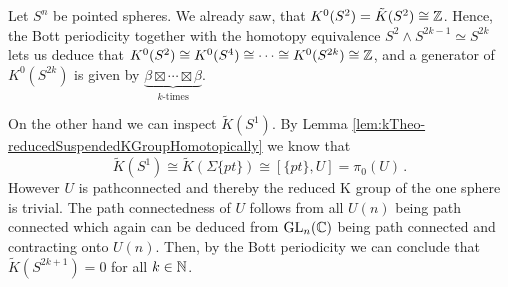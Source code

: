 \begin{corollary}[Spheres] \label{cor:kTheo-kGroupsOfTheSpheres}
	Let $S^n$ be pointed spheres. We already saw, that $K^0(S^2)=\tilde{K}(S^2)\cong \mathbb{Z}$. 
	Hence, the Bott periodicity together with the homotopy equivalence $S^2\wedge S^{2{k-1}}\simeq S^{2k}$ lets us deduce that $K^0(S^2)\cong K^0(S^4)\cong \cdots \cong K^0(S^{2k})\cong \mathbb{Z}$, and a generator of $ K^0(S^{2k})$ is given by $\underbrace{\beta\boxtimes \cdots \boxtimes  \beta}_{k\text{-times}}$. 

	On the other hand we can inspect $\tilde{K}(S^1)$. By Lemma \ref{lem:kTheo-reducedSuspendedKGroupHomotopically} we know that 
	\begin{equation*}
		\tilde{K}(S^1)\cong \tilde{K}(\Sigma\{pt\})\cong[\{pt\},U]=\pi_0(U)\,.
	\end{equation*} However $U$ is pathconnected and thereby the reduced K group of the one sphere is trivial. The path connectedness of $U$ follows from all $U(n)$ being path connected which again can be deduced from $\mathrm{GL}_n(\mathbb{C})$ being path connected and contracting onto $U(n)$. Then, by the Bott periodicity we can conclude that $\tilde{K}(S^{2k+1})=0$ for all $k\in \mathbb{N}$.
\end{corollary}

